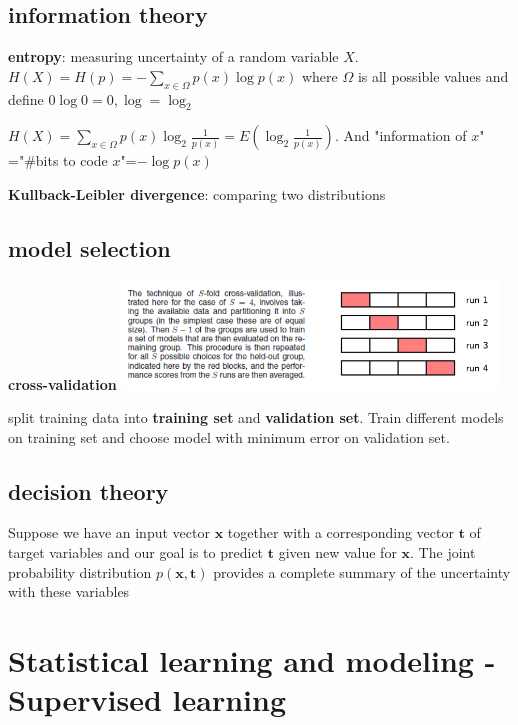 \documentclass[11pt]{article}
\newcommand{\bl}[1] {\boldsymbol{#1}}
\begin{document}
\subsection{information theory}
\label{sec:org7cdc09b}
\textbf{entropy}: measuring uncertainty of a random variable \(X\).
\(H(X)=H(p)=-\displaystyle\sum_{x\in\Omega}p(x)\log p(x)\) where \(\Omega\) is
all possible values and define \(0\log0=0,\log=\log_2\)

\(H(X)=\displaystyle\sum_{x\in\Omega}p(x)\log_2\frac{1}{p(x)}=
   E(\log_2\frac{1}{p(x)})\). And "information of \(x\)"​="\#bits to code \(x\)"​=\(-\log
   p(x)\)

\textbf{Kullback-Leibler divergence}: comparing two distributions
\subsection{model selection}
\label{sec:org959b873}
\textbf{cross-validation}
\includegraphics[width=100mm]{CrossValidation}

split training data into \textbf{training set} and \textbf{validation set}. Train different
models on training set and choose model with minimum error on validation set.
\subsection{decision theory}
\label{sec:orgbf5ea6e}
Suppose we have an input vector \(\bl{x}\) together with a corresponding vector
\(\bl{t}\) of target variables and our goal is to predict \(\bl{t}\) given new
value for \(\bl{x}\). The joint probability distribution \(p(\bl{x},\bl{t})\)
provides a complete summary of the uncertainty with these variables
\section{Statistical learning and modeling - Supervised learning}
\label{sec:orgf3463ed}
\end{document}
